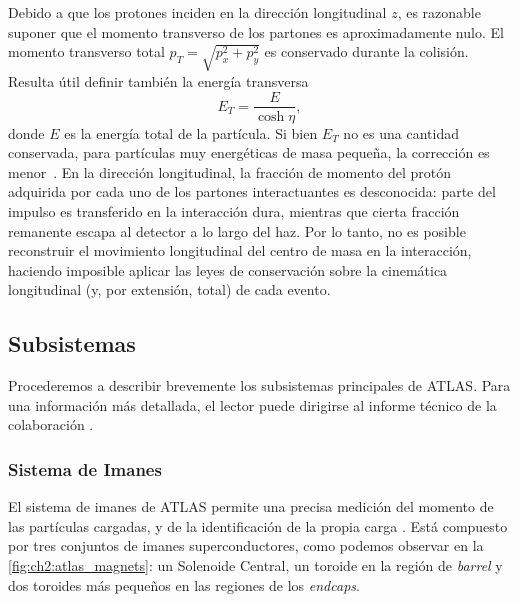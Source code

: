 Debido a que los protones inciden en la dirección longitudinal $z$, es razonable suponer que el momento transverso de los partones es aproximadamente nulo. El momento transverso total $p_T = \sqrt{p_x^2 + p_y^2}$ es conservado durante la colisión. Resulta útil definir también la energía transversa
\[ E_T = \frac{E}{\cosh\eta}, \]
donde $E$ es la energía total de la partícula. Si bien $E_T$ no es una cantidad conservada, para partículas muy energéticas de masa pequeña, la corrección es menor~\cite{gallicchio2018quit}. En la dirección longitudinal, la fracción de momento del protón adquirida por cada uno de los partones interactuantes es desconocida: parte del impulso es transferido en la interacción dura, mientras que cierta fracción remanente escapa al detector a lo largo del haz. Por lo tanto, no es posible reconstruir el movimiento longitudinal del centro de masa en la interacción, haciendo imposible aplicar las leyes de conservación sobre la cinemática longitudinal (y, por extensión, total) de cada evento.


\subsection{Subsistemas}

Procederemos a describir brevemente los subsistemas principales de ATLAS. Para una información más detallada, el lector puede dirigirse al informe técnico de la colaboración \cite{Aad2008}.

\subsubsection{Sistema de Imanes}

El sistema de imanes de ATLAS permite una precisa medición del momento de las partículas cargadas, y de la identificación de la propia carga \cite{TenKate1999}. Está compuesto por tres conjuntos de imanes superconductores, como podemos observar en la \cref{fig:ch2:atlas_magnets}: un Solenoide Central, un toroide en la región de \textit{barrel} y dos toroides más pequeños en las regiones de los \textit{endcaps}.

